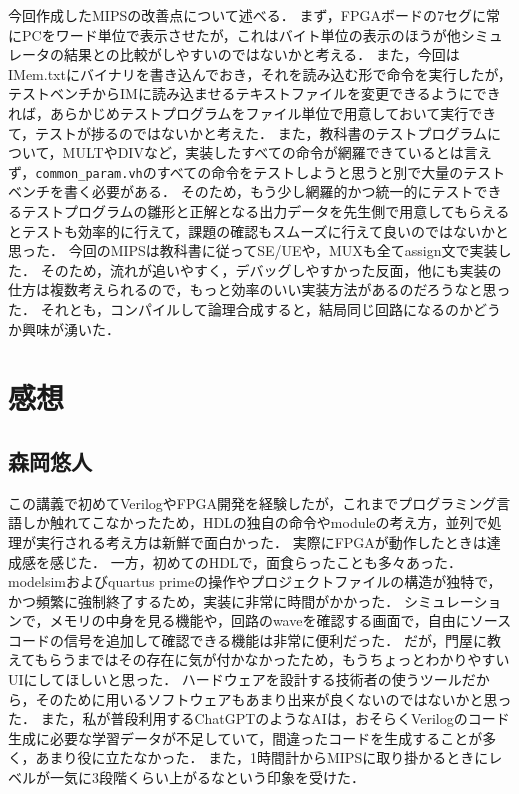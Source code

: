 \documentclass[dvipdfmx]{jsarticle}
\begin{document}
今回作成したMIPSの改善点について述べる．
まず，FPGAボードの7セグに常にPCをワード単位で表示させたが，これはバイト単位の表示のほうが他シミュレータの結果との比較がしやすいのではないかと考える．
また，今回はIMem.txtにバイナリを書き込んでおき，それを読み込む形で命令を実行したが，テストベンチからIMに読み込ませるテキストファイルを変更できるようにできれば，あらかじめテストプログラムをファイル単位で用意しておいて実行できて，テストが捗るのではないかと考えた．
また，教科書のテストプログラムについて，MULTやDIVなど，実装したすべての命令が網羅できているとは言えず，\texttt{common_param.vh}のすべての命令をテストしようと思うと別で大量のテストベンチを書く必要がある．
そのため，もう少し網羅的かつ統一的にテストできるテストプログラムの雛形と正解となる出力データを先生側で用意してもらえるとテストも効率的に行えて，課題の確認もスムーズに行えて良いのではないかと思った．
今回のMIPSは教科書に従ってSE/UEや，MUXも全てassign文で実装した．
そのため，流れが追いやすく，デバッグしやすかった反面，他にも実装の仕方は複数考えられるので，もっと効率のいい実装方法があるのだろうなと思った．
それとも，コンパイルして論理合成すると，結局同じ回路になるのかどうか興味が湧いた．





\section{感想}
\subsection{森岡悠人}

この講義で初めてVerilogやFPGA開発を経験したが，これまでプログラミング言語しか触れてこなかったため，HDLの独自の命令やmoduleの考え方，並列で処理が実行される考え方は新鮮で面白かった．
実際にFPGAが動作したときは達成感を感じた．
一方，初めてのHDLで，面食らったことも多々あった．
modelsimおよびquartus primeの操作やプロジェクトファイルの構造が独特で，かつ頻繁に強制終了するため，実装に非常に時間がかかった．
シミュレーションで，メモリの中身を見る機能や，回路のwaveを確認する画面で，自由にソースコードの信号を追加して確認できる機能は非常に便利だった．
だが，門屋に教えてもらうまではその存在に気が付かなかったため，もうちょっとわかりやすいUIにしてほしいと思った．
ハードウェアを設計する技術者の使うツールだから，そのために用いるソフトウェアもあまり出来が良くないのではないかと思った．
また，私が普段利用するChatGPTのようなAIは，おそらくVerilogのコード生成に必要な学習データが不足していて，間違ったコードを生成することが多く，あまり役に立たなかった．
また，1時間計からMIPSに取り掛かるときにレベルが一気に3段階くらい上がるなという印象を受けた．
\end{document}
